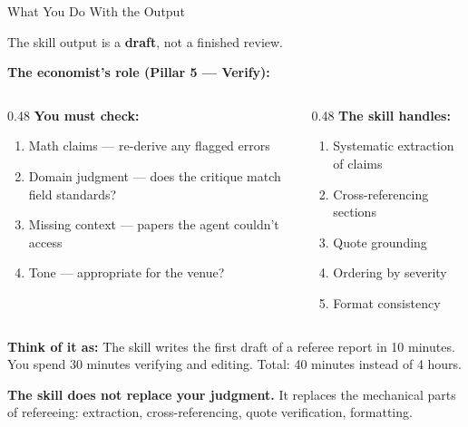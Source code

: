 \documentclass[10pt,english,aspectratio=169]{beamer}
\begin{document}
\begin{frame}{What You Do With the Output}

The skill output is a \textbf{draft}, not a finished review.

\vspace{0.3cm}
\textbf{The economist's role (Pillar 5 --- Verify):}

\vspace{0.2cm}
\begin{columns}[T]
\begin{column}{0.48\textwidth}
\textbf{You must check:}
\begin{enumerate}
    \item Math claims --- re-derive any flagged errors
    \item Domain judgment --- does the critique match field standards?
    \item Missing context --- papers the agent couldn't access
    \item Tone --- appropriate for the venue?
\end{enumerate}
\end{column}

\begin{column}{0.48\textwidth}
\textbf{The skill handles:}
\begin{enumerate}
    \item Systematic extraction of claims
    \item Cross-referencing sections
    \item Quote grounding
    \item Ordering by severity
    \item Format consistency
\end{enumerate}
\end{column}
\end{columns}

\vspace{0.4cm}
\textbf{Think of it as:} The skill writes the first draft of a referee report in 10 minutes. You spend 30 minutes verifying and editing. Total: 40 minutes instead of 4 hours.

\vspace{0.2cm}
\textbf{The skill does not replace your judgment.} It replaces the mechanical parts of refereeing: extraction, cross-referencing, quote verification, formatting.

\end{frame}


\end{document}
